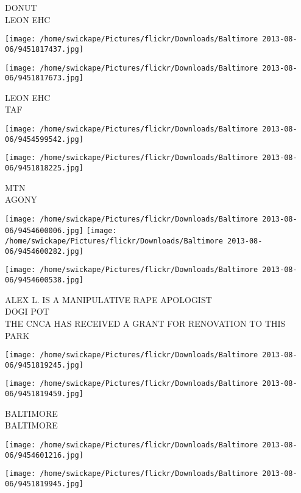 \documentclass[10pt,letterpaper]{article}
\begin{document}
DONUT\\
LEON EHC
\pagebreak

\texttt{[image: /home/swickape/Pictures/flickr/Downloads/Baltimore 2013-08-06/9451817437.jpg]}

\vspace{0.25in}
\texttt{[image: /home/swickape/Pictures/flickr/Downloads/Baltimore 2013-08-06/9451817673.jpg]}

LEON EHC\\
TAF
\pagebreak

\texttt{[image: /home/swickape/Pictures/flickr/Downloads/Baltimore 2013-08-06/9454599542.jpg]}

\vspace{0.25in}
\texttt{[image: /home/swickape/Pictures/flickr/Downloads/Baltimore 2013-08-06/9451818225.jpg]}

MTN\\
AGONY
\pagebreak

\texttt{[image: /home/swickape/Pictures/flickr/Downloads/Baltimore 2013-08-06/9454600006.jpg]}
\texttt{[image: /home/swickape/Pictures/flickr/Downloads/Baltimore 2013-08-06/9454600282.jpg]}

\vspace{0.25in}
\texttt{[image: /home/swickape/Pictures/flickr/Downloads/Baltimore 2013-08-06/9454600538.jpg]}

ALEX L. IS A MANIPULATIVE RAPE APOLOGIST\\
DOGI POT\\
THE CNCA HAS RECEIVED A GRANT FOR RENOVATION TO THIS PARK
\pagebreak

\texttt{[image: /home/swickape/Pictures/flickr/Downloads/Baltimore 2013-08-06/9451819245.jpg]}

\vspace{0.25in}
\texttt{[image: /home/swickape/Pictures/flickr/Downloads/Baltimore 2013-08-06/9451819459.jpg]}

BALTIMORE\\
BALTIMORE
\pagebreak

\texttt{[image: /home/swickape/Pictures/flickr/Downloads/Baltimore 2013-08-06/9454601216.jpg]}

\vspace{0.25in}
\texttt{[image: /home/swickape/Pictures/flickr/Downloads/Baltimore 2013-08-06/9451819945.jpg]}
\end{document}
